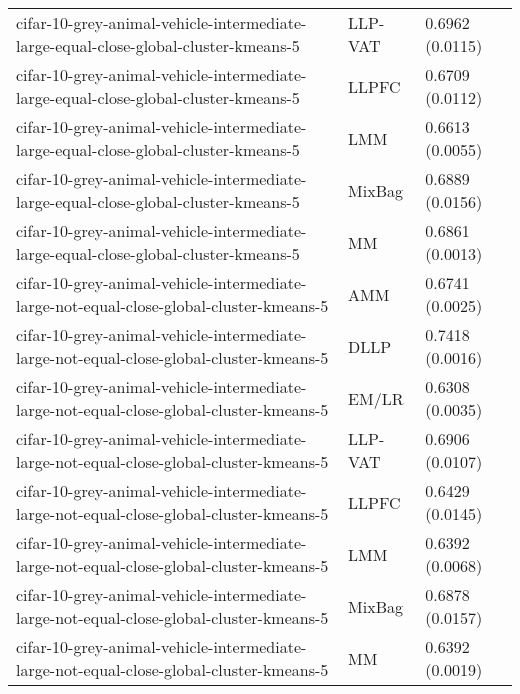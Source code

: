 \begin{longtable}{lll}
                          cifar-10-grey-animal-vehicle-intermediate-large-equal-close-global-cluster-kmeans-5 &   LLP-VAT &                           0.6962 (0.0115) \\
                          cifar-10-grey-animal-vehicle-intermediate-large-equal-close-global-cluster-kmeans-5 &     LLPFC &                           0.6709 (0.0112) \\
                          cifar-10-grey-animal-vehicle-intermediate-large-equal-close-global-cluster-kmeans-5 &       LMM &                           0.6613 (0.0055) \\
                          cifar-10-grey-animal-vehicle-intermediate-large-equal-close-global-cluster-kmeans-5 &    MixBag &                           0.6889 (0.0156) \\
                          cifar-10-grey-animal-vehicle-intermediate-large-equal-close-global-cluster-kmeans-5 &        MM &                           0.6861 (0.0013) \\
                      cifar-10-grey-animal-vehicle-intermediate-large-not-equal-close-global-cluster-kmeans-5 &       AMM &                           0.6741 (0.0025) \\
                      cifar-10-grey-animal-vehicle-intermediate-large-not-equal-close-global-cluster-kmeans-5 &      DLLP &                           0.7418 (0.0016) \\
                      cifar-10-grey-animal-vehicle-intermediate-large-not-equal-close-global-cluster-kmeans-5 &     EM/LR &                           0.6308 (0.0035) \\
                      cifar-10-grey-animal-vehicle-intermediate-large-not-equal-close-global-cluster-kmeans-5 &   LLP-VAT &                           0.6906 (0.0107) \\
                      cifar-10-grey-animal-vehicle-intermediate-large-not-equal-close-global-cluster-kmeans-5 &     LLPFC &                           0.6429 (0.0145) \\
                      cifar-10-grey-animal-vehicle-intermediate-large-not-equal-close-global-cluster-kmeans-5 &       LMM &                           0.6392 (0.0068) \\
                      cifar-10-grey-animal-vehicle-intermediate-large-not-equal-close-global-cluster-kmeans-5 &    MixBag &                           0.6878 (0.0157) \\
                      cifar-10-grey-animal-vehicle-intermediate-large-not-equal-close-global-cluster-kmeans-5 &        MM &                           0.6392 (0.0019) \\

\end{longtable}
